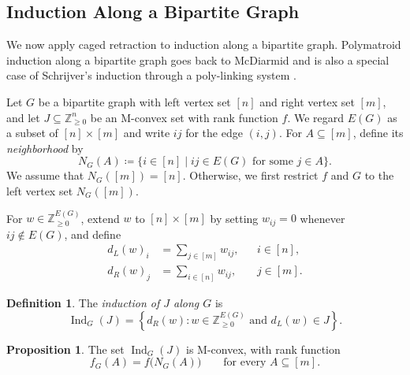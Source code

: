 \documentclass[11pt]{article}
\theoremstyle{definition}
\newtheorem{proposition}[theorem]{Proposition}
\newtheorem{definition}[theorem]{Definition}
\theoremstyle{remark}
\begin{document}
\subsection{Induction Along a Bipartite Graph}
We now apply caged retraction to induction along a bipartite graph. Polymatroid induction along a bipartite graph goes back to McDiarmid \cite{mcdiarmidRadosTheoremPolymatroids1975} and is also a special case of Schrijver's induction through a poly-linking system \cite[Chapter~6]{schrijverMatroidsLinkingSystems1978}.

Let $G$ be a bipartite graph with left vertex set $[n]$ and right vertex set $[m]$, and let $J\subseteq\mathbb{Z}_{\geq 0}^n$ be an M-convex set with rank function $f$.
We regard $E(G)$ as a subset of $[n]\times[m]$ and write $ij$ for the edge $(i,j)$. For $A\subseteq[m]$, define its \emph{neighborhood} by
\[
    N_G(A)
    \coloneqq
    \{i\in[n]\mid ij\in E(G)\text{ for some }j\in A\}.
\]
We assume that $N_G([m])=[n]$. Otherwise, we first restrict $f$ and $G$ to the left vertex set $N_G([m])$.

For $w\in\mathbb{Z}_{\geq 0}^{E(G)}$, extend $w$ to $[n]\times[m]$ by setting $w_{ij}=0$ whenever $ij\notin E(G)$, and define
\[
    \begin{aligned}
        d_L(w)_i&=\sum_{j\in[m]}w_{ij},
        &&i\in[n],\\
        d_R(w)_j&=\sum_{i\in[n]}w_{ij},
        &&j\in[m].
    \end{aligned}
\]

\begin{definition}
    The \emph{induction of $J$ along $G$} is
    \[
        \operatorname{Ind}_G(J)
        =
        \left\{
            d_R(w):
            w\in\mathbb{Z}_{\geq 0}^{E(G)}
            \text{ and }
            d_L(w)\in J
        \right\}.
    \]
\end{definition}

\begin{proposition}\label{prop:bipartite_induction_rank}
    The set $\operatorname{Ind}_G(J)$ is M-convex, with rank function
    \[
        f_G(A)=f\bigl(N_G(A)\bigr)
        \qquad
        \text{for every }A\subseteq[m].
    \]
\end{proposition}
\end{document}
